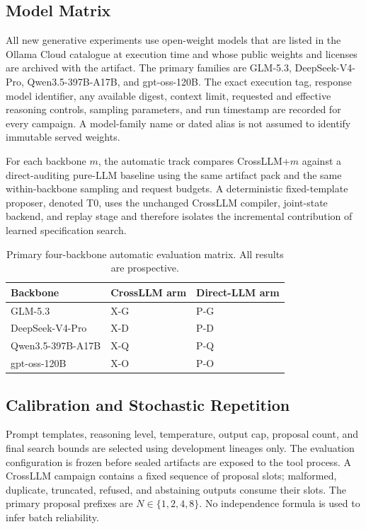 \documentclass[journal]{IEEEtran}
\theoremstyle{definition}
\begin{document}
\subsection{Model Matrix}
All new generative experiments use open-weight models that are listed in the Ollama Cloud catalogue at execution time and whose public weights and licenses are archived with the artifact. The primary families are GLM-5.3, DeepSeek-V4-Pro, Qwen3.5-397B-A17B, and gpt-oss-120B. The exact execution tag, response model identifier, any available digest, context limit, requested and effective reasoning controls, sampling parameters, and run timestamp are recorded for every campaign. A model-family name or dated alias is not assumed to identify immutable served weights.

For each backbone $m$, the automatic track compares CrossLLM+$m$ against a direct-auditing pure-LLM baseline using the same artifact pack and the same within-backbone sampling and request budgets. A deterministic fixed-template proposer, denoted T0, uses the unchanged CrossLLM compiler, joint-state backend, and replay stage and therefore isolates the incremental contribution of learned specification search.

\begin{table}[t]
\centering
\caption{Primary four-backbone automatic evaluation matrix. All results are prospective.}
\label{tab:model-matrix}
\small
\begin{tabular}{@{}lll@{}}
\toprule
Backbone & CrossLLM arm & Direct-LLM arm \\ \midrule
GLM-5.3 & X-G & P-G \\
DeepSeek-V4-Pro & X-D & P-D \\
Qwen3.5-397B-A17B & X-Q & P-Q \\
gpt-oss-120B & X-O & P-O \\
\bottomrule
\end{tabular}
\end{table}

\subsection{Calibration and Stochastic Repetition}
Prompt templates, reasoning level, temperature, output cap, proposal count, and final search bounds are selected using development lineages only. The evaluation configuration is frozen before sealed artifacts are exposed to the tool process. A CrossLLM campaign contains a fixed sequence of proposal slots; malformed, duplicate, truncated, refused, and abstaining outputs consume their slots. The primary proposal prefixes are $N\in\{1,2,4,8\}$. No independence formula is used to infer batch reliability.
\end{document}
